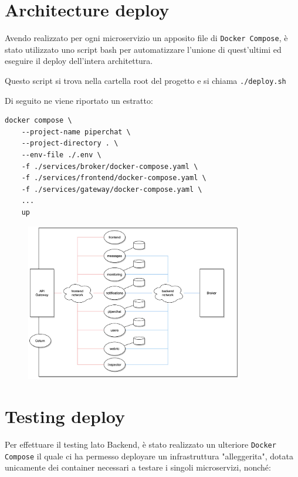 %
%
%
\section{Architecture deploy}

Avendo realizzato per ogni microservizio un apposito file  di \texttt{Docker Compose}, è stato utilizzato uno script bash per automatizzare l'unione di quest'ultimi ed eseguire il deploy dell'intera architettura.

Questo script si trova nella cartella root del progetto e si chiama \texttt{./deploy.sh}

Di seguito ne viene riportato un estratto:

\begin{verbatim}
docker compose \
    --project-name piperchat \
    --project-directory . \
    --env-file ./.env \
    -f ./services/broker/docker-compose.yaml \
    -f ./services/frontend/docker-compose.yaml \
    -f ./services/gateway/docker-compose.yaml \
    ...
    up
\end{verbatim}

\begin{figure}[htbp]
    \centering
    \includegraphics[width=0.85\textwidth]{img/07-deployment/architecture-deployment.jpg}
    \label{fig:architecture-deployment}
\end{figure}

%
%
%
\newpage
\section{Testing deploy}

Per effettuare il testing lato Backend, è stato realizzato un ulteriore \texttt{Docker Compose} il quale ci ha permesso deployare un infrastruttura "alleggerita", dotata unicamente dei container necessari a testare i singoli microservizi, nonché:

